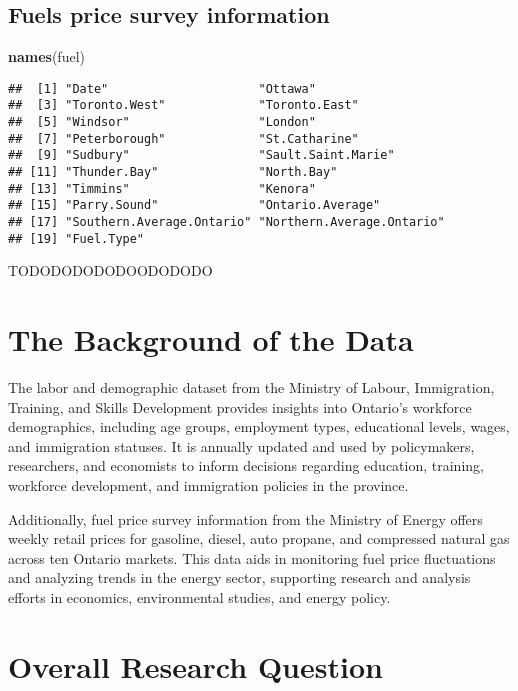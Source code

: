 \documentclass[
]{article}
\newenvironment{Shaded}{\begin{snugshade}}{\end{snugshade}}
\newcommand{\FunctionTok}[1]{\textcolor[rgb]{0.13,0.29,0.53}{\textbf{#1}}}
\newcommand{\NormalTok}[1]{#1}
\begin{document}
\subsection{Fuels price survey
information}\label{fuels-price-survey-information}

\begin{Shaded}
\begin{Highlighting}[]
\FunctionTok{names}\NormalTok{(fuel)}
\end{Highlighting}
\end{Shaded}

\begin{verbatim}
##  [1] "Date"                     "Ottawa"                  
##  [3] "Toronto.West"             "Toronto.East"            
##  [5] "Windsor"                  "London"                  
##  [7] "Peterborough"             "St.Catharine"            
##  [9] "Sudbury"                  "Sault.Saint.Marie"       
## [11] "Thunder.Bay"              "North.Bay"               
## [13] "Timmins"                  "Kenora"                  
## [15] "Parry.Sound"              "Ontario.Average"         
## [17] "Southern.Average.Ontario" "Northern.Average.Ontario"
## [19] "Fuel.Type"
\end{verbatim}

TODODODODODOODODODO

\section{The Background of the Data}\label{the-background-of-the-data}

The labor and demographic dataset from the Ministry of Labour,
Immigration, Training, and Skills Development provides insights into
Ontario's workforce demographics, including age groups, employment
types, educational levels, wages, and immigration statuses. It is
annually updated and used by policymakers, researchers, and economists
to inform decisions regarding education, training, workforce
development, and immigration policies in the province.

Additionally, fuel price survey information from the Ministry of Energy
offers weekly retail prices for gasoline, diesel, auto propane, and
compressed natural gas across ten Ontario markets. This data aids in
monitoring fuel price fluctuations and analyzing trends in the energy
sector, supporting research and analysis efforts in economics,
environmental studies, and energy policy.

\section{Overall Research Question}\label{overall-research-question}
\end{document}
